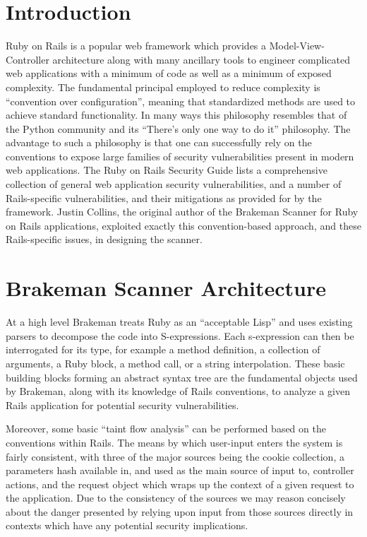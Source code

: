 \documentclass[conference]{IEEEtran}
\begin{document}
\section{Introduction}

Ruby on Rails is a popular web framework which provides a Model-View-Controller
architecture along with many ancillary tools to engineer complicated web
applications with a minimum of code as well as a minimum of exposed complexity.
The fundamental principal employed to reduce complexity is ``convention over
configuration'', meaning that standardized methods are used to achieve standard
functionality.  In many ways this philosophy resembles that of the Python
community and its ``There's only one way to do it'' philosophy.  The
advantage to such a philosophy is that one can successfully rely on the
conventions to expose large families of security vulnerabilities present in
modern web applications.  The Ruby on Rails Security Guide\cite{rails_security}
lists a comprehensive collection of general web application security
vulnerabilities, and a number of Rails-specific vulnerabilities, and their
mitigations as provided for by the framework.  Justin Collins, the original
author of the Brakeman Scanner for Ruby on Rails applications, exploited exactly
this convention-based approach, and these Rails-specific issues, in designing
the scanner.

\section{Brakeman Scanner Architecture}

At a high level Brakeman treats Ruby as an ``acceptable Lisp'' and uses
existing parsers to decompose the code into S-expressions\cite{sexp_for_rubyists}.  Each
s-expression can then be interrogated for its type, for example a method definition, a
collection of arguments, a Ruby block, a method call, or a string interpolation.  These
basic building blocks forming an abstract syntax tree are the fundamental objects used by
Brakeman, along with its knowledge of Rails conventions, to analyze a given Rails
application for potential security vulnerabilities.

Moreover, some basic ``taint flow analysis'' can be performed based on the conventions
within Rails.  The means by which user-input enters the system is fairly consistent, with
three of the major sources being the cookie collection, a parameters hash available in,
and used as the main source of input to, controller actions, and the request object which
wraps up the context of a given request to the application.  Due to the consistency of the
sources we may reason concisely about the danger presented by relying upon input from
those sources directly in contexts which have any potential security implications.
\end{document}
